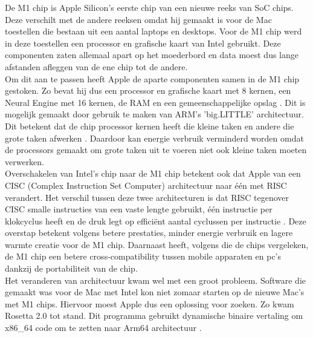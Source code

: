 \documentclass{hogent-article}
\begin{document}


De M1 chip is Apple Silicon's eerste chip van een nieuwe reeks van SoC chips. Deze verschilt met de andere reeksen omdat hij gemaakt is voor de Mac toestellen die bestaan uit een aantal laptops en desktops. Voor de M1 chip werd in deze toestellen een processor en grafische kaart van Intel gebruikt. Deze componenten zaten allemaal apart op het moederbord en data moest dus lange afstanden afleggen van de ene chip tot de andere. \\
Om dit aan te passen heeft Apple de aparte componenten samen in de M1 chip gestoken. Zo bevat hij dus een processor en grafische kaart met 8 kernen, een Neural Engine met 16 kernen, de RAM en een gemeenschappelijke opslag \autocite{Apple2020}. Dit is mogelijk gemaakt door gebruik te maken van ARM's 'big.LITTLE' architectuur. Dit betekent dat de chip processor kernen heeft die kleine taken en andere die grote taken afwerken \autocite{ARM2014}. Daardoor kan energie verbruik verminderd worden omdat de processors gemaakt om grote taken uit te voeren niet ook kleine taken moeten verwerken. \\
Overschakelen van Intel's chip naar de M1 chip betekent ook dat Apple van een CISC (Complex Instruction Set Computer) architectuur naar één met RISC verandert. Het verschil tussen deze twee architecturen is dat RISC tegenover CISC smalle instructies van een vaste lengte gebruikt, één instructie per klokcyclus heeft en de druk legt op efficiënt aantal cyclussen per instructie \autocite{Thornton2018}. Deze overstap betekent volgens \textcite{Frazelle2021} betere prestaties, minder energie verbruik en lagere warmte creatie voor de M1 chip. Daarnaast heeft, volgens \textcite{Dalakoti2022} die de chips vergeleken, de M1 chip een betere cross-compatibility tussen mobile apparaten en pc's dankzij de portabiliteit van de chip. \\
Het veranderen van architectuur kwam wel met een groot probleem. Software die gemaakt was voor de Mac met Intel kon niet zomaar starten op de nieuwe Mac's met M1 chips. Hiervoor moest Apple dus een oplossing voor zoeken. Zo kwam Rosetta 2.0 tot stand. Dit programma gebruikt dynamische binaire vertaling om x86\_64 code om te zetten naar Arm64 architectuur \autocite{Edwards2022}.
\end{document}

